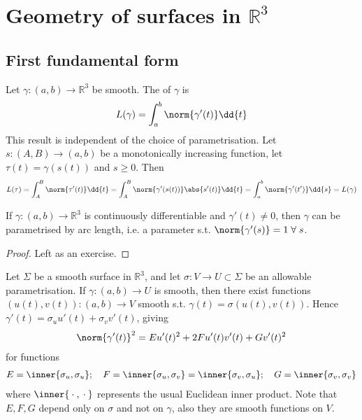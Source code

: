 \section{Geometry of surfaces in $\mathbb R^3$}

\subsection{First fundamental form}
Let $\gamma \colon (a,b) \to \mathbb R^3$ be smooth.
The  of $\gamma$ is
\begin{align*}
	L(\gamma) = \int_a^b \norm{\gamma'(t)} \dd{t}
\end{align*}
This result is independent of the choice of parametrisation.
Let $s \colon (A,B) \to (a,b)$ be a monotonically increasing function, let $\tau(t) = \gamma(s(t))$ and $s \geq 0$.
Then
\begin{align*}
	L(\tau) = \int_A^B \norm{\tau'(t)} \dd{t} = \int_A^B \norm{\gamma'(s(t))} \abs{s'(t)} \dd{t} = \int_a^b \norm{\gamma'(t')} \dd{s} = L(\gamma)
\end{align*}

\begin{lemma}
	If $\gamma \colon (a,b) \to \mathbb R^3$ is continuously differentiable and $\gamma'(t) \neq 0$, then $\gamma$ can be parametrised by arc length, i.e. a parameter s.t. $\norm{\gamma'(s)} = 1 \; \forall \; s$.
\end{lemma}

\begin{proof}
	Left as an exercise.
\end{proof} 

Let $\Sigma$ be a smooth surface in $\mathbb R^3$, and let $\sigma \colon V \to U \subset \Sigma$ be an allowable parametrisation.
If $\gamma \colon (a,b) \to U$ is smooth, then there exist functions $(u(t), v(t)) \colon (a,b) \to V$ smooth s.t. $\gamma(t) = \sigma(u(t), v(t))$.
Hence $\gamma'(t) = \sigma_u u'(t) + \sigma_v v'(t)$, giving
\begin{align*}
	\norm{\gamma'(t)}^2 = E u'(t)^2 + 2F u'(t) v'(t) + G v'(t)^2
\end{align*}
for functions
\begin{align*}
	E = \inner{\sigma_u, \sigma_u};\quad F = \inner{\sigma_u, \sigma_v} = \inner{\sigma_v, \sigma_u};\quad G = \inner{\sigma_v, \sigma_v}
\end{align*}
where $\inner{\wildcard,\wildcard}$ represents the usual Euclidean inner product.
Note that $E, F, G$ depend only on $\sigma$ and not on $\gamma$, also they are smooth functions on $V$.

